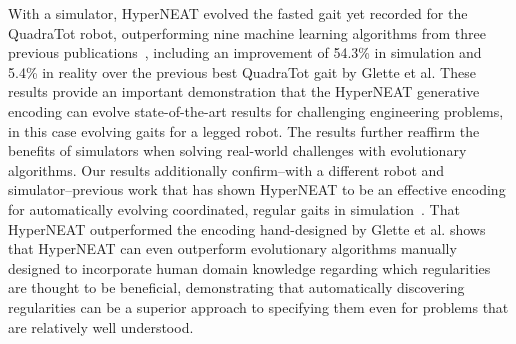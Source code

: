 
With a simulator, HyperNEAT evolved the fasted gait yet recorded for the QuadraTot robot, outperforming nine machine learning algorithms from three previous publications~\cite{yos:clune,glette,haocheng}, including an improvement of 54.3\% in simulation and 5.4\% in reality over the previous best QuadraTot gait by Glette et al. These results provide an important demonstration that the HyperNEAT generative encoding can evolve state-of-the-art results for challenging engineering problems, in this case evolving gaits for a legged robot. The results further reaffirm the benefits of simulators when solving real-world challenges with evolutionary algorithms. Our results additionally confirm--with a different robot and simulator--previous work that has shown HyperNEAT to be an effective encoding for automatically evolving coordinated, regular gaits in simulation~\cite{clune2009evolving,clune2011performance,yos:clune}. That HyperNEAT outperformed the encoding hand-designed by Glette et al. shows that HyperNEAT can even outperform evolutionary algorithms manually designed to incorporate human domain knowledge regarding which regularities are thought to be beneficial, demonstrating that automatically discovering regularities can be a superior approach to specifying them even for problems that are relatively well understood. 

